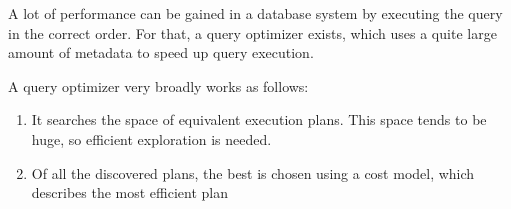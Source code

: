 A lot of performance can be gained in a database system by executing the query in the correct order.
For that, a query optimizer exists, which uses a quite large amount of metadata to speed up query execution.

A query optimizer very broadly works as follows:
\begin{enumerate}
    \item It searches the space of equivalent execution plans. This space tends to be huge, so efficient exploration is needed.
    \item Of all the discovered plans, the best is chosen using a cost model, which describes the most efficient plan
\end{enumerate}
